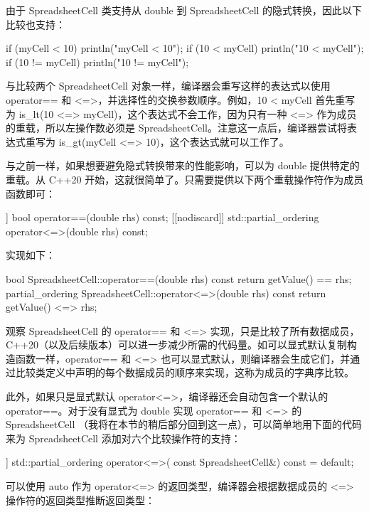 由于 SpreadsheetCell 类支持从 double 到 SpreadsheetCell 的隐式转换，因此以下比较也支持：

\begin{cpp}
if (myCell < 10) { println("myCell < 10"); }
if (10 < myCell) { println("10 < myCell"); }
if (10 != myCell) { println("10 != myCell"); }
\end{cpp}

与比较两个 SpreadsheetCell 对象一样，编译器会重写这样的表达式以使用 operator== 和 <=>，并选择性的交换参数顺序。例如，10 < myCell 首先重写为 is\_lt(10 <=> myCell)，这个表达式不会工作，因为只有一种 <=> 作为成员的重载，所以左操作数必须是 SpreadsheetCell。注意这一点后，编译器尝试将表达式重写为 is\_gt(myCell <=> 10)，这个表达式就可以工作了。

与之前一样，如果想要避免隐式转换带来的性能影响，可以为 double 提供特定的重载。从 C++20 开始，这就很简单了。只需要提供以下两个重载操作符作为成员函数即可：

\begin{cpp}
[[nodiscard]] bool operator==(double rhs) const;
[[nodiscard]] std::partial_ordering operator<=>(double rhs) const;
\end{cpp}

实现如下：

\begin{cpp}
bool SpreadsheetCell::operator==(double rhs) const
{
    return getValue() == rhs;
}
partial_ordering SpreadsheetCell::operator<=>(double rhs) const
{
    return getValue() <=> rhs;
}
\end{cpp}


观察 SpreadsheetCell 的 operator== 和 <=> 实现，只是比较了所有数据成员，C++20（以及后续版本）可以进一步减少所需的代码量。如可以显式默认复制构造函数一样，operator== 和 <=> 也可以显式默认，则编译器会生成它们，并通过比较类定义中声明的每个数据成员的顺序来实现，这称为成员的字典序比较。

此外，如果只是显式默认 operator<=>，编译器还会自动包含一个默认的 operator==。对于没有显式为 double 实现 operator== 和 <=> 的 SpreadsheetCell （我将在本节的稍后部分回到这一点），可以简单地用下面的代码来为 SpreadsheetCell 添加对六个比较操作符的支持：

\begin{cpp}
[[nodiscard]] std::partial_ordering operator<=>(
    const SpreadsheetCell&) const = default;
\end{cpp}

可以使用 auto 作为 operator<=> 的返回类型，编译器会根据数据成员的 <=> 操作符的返回类型推断返回类型：

